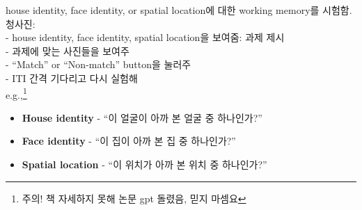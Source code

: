 \documentclass[../note.tex]{subfiles}
\begin{document}
\begin{note}
\begin{center}
    \label{fig:ch6_fMRI_blueprint}
  \end{center}

  house identity, face identity, or spatial location에 대한 working memory를 시험함.\\

  청사진:\\
  - house identity, face identity, spatial location을 보여줌: 과제 제시\\
  - 과제에 맞는 사진들을 보여주\\
  - ``Match'' or ``Non-match'' button을 눌러주\\
  - ITI 간격 기다리고 다시 실험해\\
  
  e.g.,\footnote{주의! 책 자세하지 못해 논문 gpt 돌렸음, 믿지 마셈요}
  \begin{itemize}
    \item \textbf{House identity} - ``이 얼굴이 아까 본 얼굴 중 하나인가?''
    \item \textbf{Face identity} - ``이 집이 아까 본 집 중 하나인가?''
    \item \textbf{Spatial location} - ``이 위치가 아까 본 위치 중 하나인가?''
  \end{itemize}


\end{note}
\end{document}
